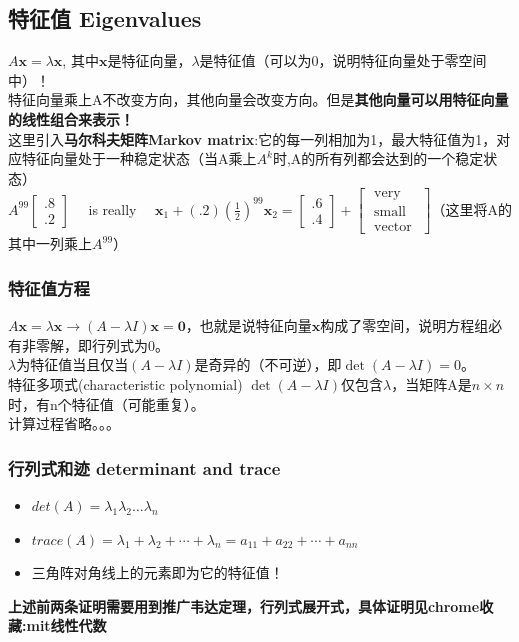 \documentclass[UTF8]{article}
\begin{document}
    \subsection{特征值 Eigenvalues}
    $A \boldsymbol{x}=\lambda \boldsymbol{x}$, 其中$\bm{x}$是特征向量，$\lambda$是特征值（可以为0，说明特征向量处于零空间中）！
    \\
    特征向量乘上A不改变方向，其他向量会改变方向。但是\textbf{其他向量可以用特征向量的线性组合来表示！}
    \\
    这里引入\textbf{马尔科夫矩阵Markov matrix}:它的每一列相加为1，最大特征值为1，对应特征向量处于一种稳定状态（当A乘上$A^{k}$时,A的所有列都会达到的一个稳定状态）\\
    $A^{99}\left[\begin{array}{l}{.8} \\ {.2}\end{array}\right] \quad$ is really $\quad \boldsymbol{x}_{1}+(.2)\left(\frac{1}{2}\right)^{99} \boldsymbol{x}_{2}=\left[\begin{array}{l}{.6} \\ {.4}\end{array}\right]+\left[\begin{array}{l}{\text { very }} \\ {\text { small }} \\ {\text { vector }}\end{array}\right]$（这里将A的其中一列乘上$A^{99}$）
    \subsubsection{特征值方程}
    $A \boldsymbol{x}=\lambda \boldsymbol{x} \rightarrow (A-\lambda I) \bm{x}=\bm{0}$，也就是说特征向量$\bm{x}$构成了零空间，说明方程组必有非零解，即行列式为0。
    \\
    $\lambda$为特征值当且仅当$(A-\lambda I)$是奇异的（不可逆），即$\operatorname{det}(A-\lambda I)=0$。
    \\
    特征多项式(characteristic polynomial) $\operatorname{det}(A-\lambda I)$仅包含$\lambda$，当矩阵A是$n \times n$时，有n个特征值（可能重复）。
    \\
    计算过程省略。。。
    \subsubsection{行列式和迹 determinant and trace}
    \begin{itemize}
        \item $det(A)=\lambda_{1}\lambda_{2}\dots\lambda_{n}$
        \item $trace(A) = \lambda_{1}+\lambda_{2}+\cdots+\lambda_{n}=a_{11}+a_{22}+\cdots+a_{n n}$
        \item 三角阵对角线上的元素即为它的特征值！
    \end{itemize}
    \textbf{上述前两条证明需要用到推广韦达定理，行列式展开式，具体证明见chrome收藏:mit线性代数}
\end{document}
